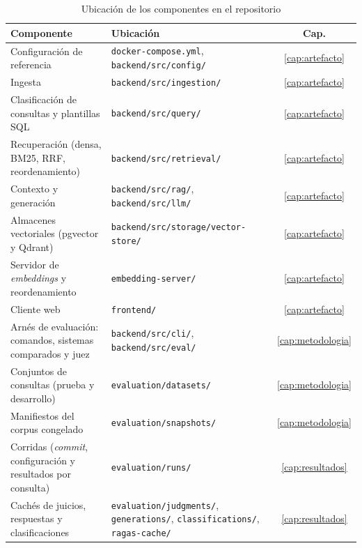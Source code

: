 \begin{table}[!htb]
    \centering
    \caption{Ubicación de los componentes en el repositorio}
    \label{tab:anx-repositorio}
    \small
    \begin{tabular}{|p{5cm}|p{7.6cm}|c|}
        \hline
        \textbf{Componente} & \textbf{Ubicación} & \textbf{Cap.} \\
        \hline
        Configuración de referencia & \texttt{docker-compose.yml}, \texttt{backend/src/config/} & \ref{cap:artefacto} \\
        \hline
        Ingesta & \texttt{backend/src/ingestion/} & \ref{cap:artefacto} \\
        \hline
        Clasificación de consultas y plantillas SQL & \texttt{backend/src/query/} & \ref{cap:artefacto} \\
        \hline
        Recuperación (densa, BM25, RRF, reordenamiento) & \texttt{backend/src/retrieval/} & \ref{cap:artefacto} \\
        \hline
        Contexto y generación & \texttt{backend/src/rag/}, \texttt{backend/src/llm/} & \ref{cap:artefacto} \\
        \hline
        Almacenes vectoriales (pgvector y Qdrant) & \texttt{backend/src/storage/vector-store/} & \ref{cap:artefacto} \\
        \hline
        Servidor de \textit{embeddings} y reordenamiento & \texttt{embedding-server/} & \ref{cap:artefacto} \\
        \hline
        Cliente web & \texttt{frontend/} & \ref{cap:artefacto} \\
        \hline
        Arnés de evaluación: comandos, sistemas comparados y juez & \texttt{backend/src/cli/}, \texttt{backend/src/eval/} & \ref{cap:metodologia} \\
        \hline
        Conjuntos de consultas (prueba y desarrollo) & \texttt{evaluation/datasets/} & \ref{cap:metodologia} \\
        \hline
        Manifiestos del corpus congelado & \texttt{evaluation/snapshots/} & \ref{cap:metodologia} \\
        \hline
        Corridas (\textit{commit}, configuración y resultados por consulta) & \texttt{evaluation/runs/} & \ref{cap:resultados} \\
        \hline
        Cachés de juicios, respuestas y clasificaciones & \texttt{evaluation/judgments/}, \texttt{generations/}, \texttt{classifications/}, \texttt{ragas-cache/} & \ref{cap:resultados} \\

\end{tabular}
\end{table}
